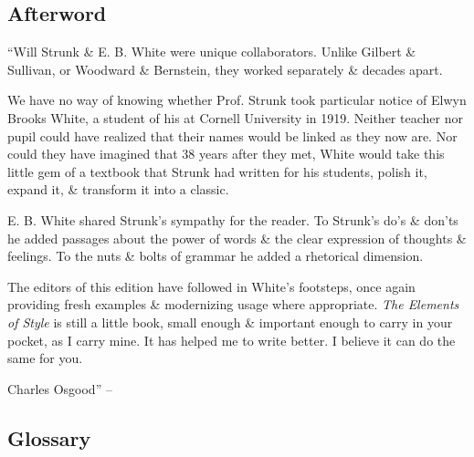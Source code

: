 \documentclass{article}
\begin{document}

\subsection{Afterword}
``Will Strunk \& E. B. White were unique collaborators. Unlike Gilbert \& Sullivan, or Woodward \& Bernstein, they worked separately \& decades apart.

We have no way of knowing whether Prof. Strunk took particular notice of Elwyn Brooks White, a student of his at Cornell University in 1919. Neither teacher nor pupil could have realized that their names would be linked as they now are. Nor could they have imagined that 38 years after they met, White would take this little gem of a textbook that Strunk had written for his students, polish it, expand it, \& transform it into a classic.

E. B. White shared Strunk's sympathy for the reader. To Strunk's do's \& don'ts he added passages about the power of words \& the clear expression of thoughts \& feelings. To the nuts \& bolts of grammar he added a rhetorical dimension.

The editors of this edition have followed in White's footsteps, once again providing fresh examples \& modernizing usage where appropriate. {\it The Elements of Style} is still a little book, small enough \& important enough to carry in your pocket, as I carry mine. It has helped me to write better. I believe it can do the same for you.

{\sc Charles Osgood}'' -- \cite[p. 104]{Strunk_White_element_style}


\subsection{Glossary}
\end{document}
